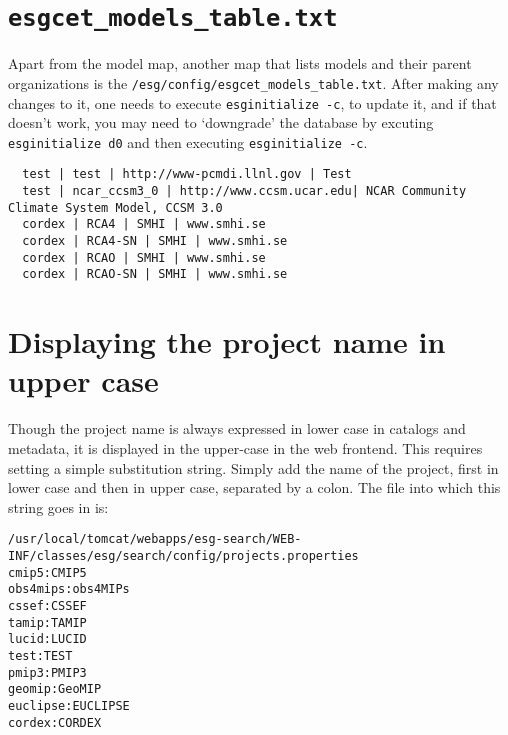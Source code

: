 \section{\texttt{esgcet\_models\_table.txt}}
Apart from the model map, another map that lists models and their parent organizations is the \texttt{/esg/config/esgcet\_models\_table.txt}. After making any changes to it, one needs to execute \texttt{esginitialize -c}, to update it, and if that doesn't work, you may need to `downgrade' the database by excuting \texttt{esginitialize \myopt d0} and then executing \texttt{esginitialize -c}.
\begin{tiny}
\begin{verbatim}
  test | test | http://www-pcmdi.llnl.gov | Test
  test | ncar_ccsm3_0 | http://www.ccsm.ucar.edu| NCAR Community Climate System Model, CCSM 3.0
  cordex | RCA4 | SMHI | www.smhi.se
  cordex | RCA4-SN | SMHI | www.smhi.se
  cordex | RCAO | SMHI | www.smhi.se
  cordex | RCAO-SN | SMHI | www.smhi.se
\end{verbatim}
\end{tiny}

\section{Displaying the project name in upper case}
Though the project name is always expressed in lower case in catalogs and metadata, it is displayed in the upper-case in the web frontend. This requires setting a simple substitution string. Simply add the name of the project, first in lower case and then in upper case, separated by a colon. The file into which this string goes in is:
\vspace{-4mm}
\begin{small}
\begin{verbatim}
/usr/local/tomcat/webapps/esg-search/WEB-INF/classes/esg/search/config/projects.properties
cmip5:CMIP5
obs4mips:obs4MIPs
cssef:CSSEF
tamip:TAMIP
lucid:LUCID
test:TEST
pmip3:PMIP3
geomip:GeoMIP
euclipse:EUCLIPSE
cordex:CORDEX
\end{verbatim}
\end{small}

